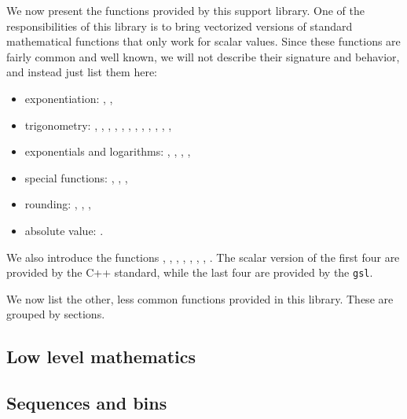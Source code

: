 We now present the functions provided by this support library. One of the responsibilities of this library is to bring vectorized versions of standard mathematical functions that only work for scalar values. Since these functions are fairly common and well known, we will not describe their signature and behavior, and instead just list them here:
\begin{itemize}
\item exponentiation: , ,
\item trigonometry: , , , , , , , , , , , ,
\item exponentials and logarithms: , , , ,
\item special functions: , , ,
\item rounding: , , ,
\item absolute value: .
\end{itemize}

We also introduce the functions , , , , , , , . The scalar version of the first four are provided by the C++ standard, while the last four are provided by the \texttt{gsl}.

We now list the other, less common functions provided in this library. These are grouped by sections.

\subsection{Low level mathematics \label{SEC:support:math:lowlevel}}


\subsection{Sequences and bins \label{SEC:support:math:sequence}}

